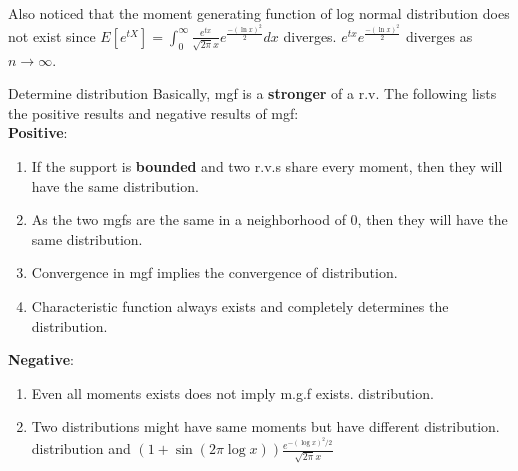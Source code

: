 \documentclass[../Transformation.tex]{subfiles}
\begin{document}
\begin{remark}
Also noticed that the moment generating function of log normal distribution does not exist since $E[e^{tX}]=\int_0^\infty\frac{e^{tx}}{\sqrt{2\pi}x}e^{\frac{-(\ln x)^2}{2}}dx$ diverges. $e^{tx}e^{\frac{-(\ln x)^2}{2}}$ diverges as $n\rightarrow\infty$.
\end{remark}

\begin{conclusion}{Determine distribution}
	Basically, mgf is a {\bf stronger} of a r.v. The following lists the positive results and negative results of mgf:\\
	{\bf Positive}:
	\begin{enumerate}
		\item If the support is {\bf bounded} and two r.v.s share every moment, then they will have the same distribution.
		\item As the two mgfs are the same in a neighborhood of 0, then they will have the same distribution.
		\item Convergence in mgf implies the convergence of distribution.
		\item Characteristic function always exists and completely determines the distribution.
	\end{enumerate}
	{\bf Negative}:
	\begin{enumerate}
		\item Even all moments exists does not imply m.g.f exists.  distribution.
		\item Two distributions might have same moments but have different distribution.  distribution and $(1+\sin(2\pi\log x))\frac{e^{-(\log x)^2/2}}{\sqrt{2\pi}x}$
	\end{enumerate}
\end{conclusion}
\end{document}
